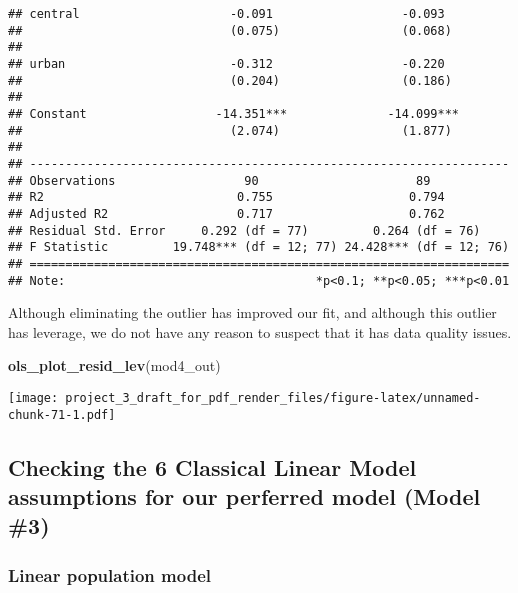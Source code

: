 \documentclass[]{article}
\newenvironment{Shaded}{\begin{snugshade}}{\end{snugshade}}
\newcommand{\KeywordTok}[1]{\textcolor[rgb]{0.13,0.29,0.53}{\textbf{#1}}}
\newcommand{\NormalTok}[1]{#1}
\begin{document}
\begin{verbatim}
## central                     -0.091                  -0.093         
##                             (0.075)                 (0.068)        
##                                                                    
## urban                       -0.312                  -0.220         
##                             (0.204)                 (0.186)        
##                                                                    
## Constant                  -14.351***              -14.099***       
##                             (2.074)                 (1.877)        
##                                                                    
## -------------------------------------------------------------------
## Observations                  90                      89           
## R2                           0.755                   0.794         
## Adjusted R2                  0.717                   0.762         
## Residual Std. Error     0.292 (df = 77)         0.264 (df = 76)    
## F Statistic         19.748*** (df = 12; 77) 24.428*** (df = 12; 76)
## ===================================================================
## Note:                                   *p<0.1; **p<0.05; ***p<0.01
\end{verbatim}

Although eliminating the outlier has improved our fit, and although this
outlier has leverage, we do not have any reason to suspect that it has
data quality issues.

\begin{Shaded}
\begin{Highlighting}[]
\KeywordTok{ols_plot_resid_lev}\NormalTok{(mod4_out)}
\end{Highlighting}
\end{Shaded}

\texttt{[image: project\_3\_draft\_for\_pdf\_render\_files/figure-latex/unnamed-chunk-71-1.pdf]}

\hypertarget{checking-the-6-classical-linear-model-assumptions-for-our-perferred-model-model-3}{%
\subsection{Checking the 6 Classical Linear Model assumptions for our
perferred model (Model
\#3)}\label{checking-the-6-classical-linear-model-assumptions-for-our-perferred-model-model-3}}

\hypertarget{linear-population-model}{%
\subsubsection{Linear population model}\label{linear-population-model}}
\end{document}
